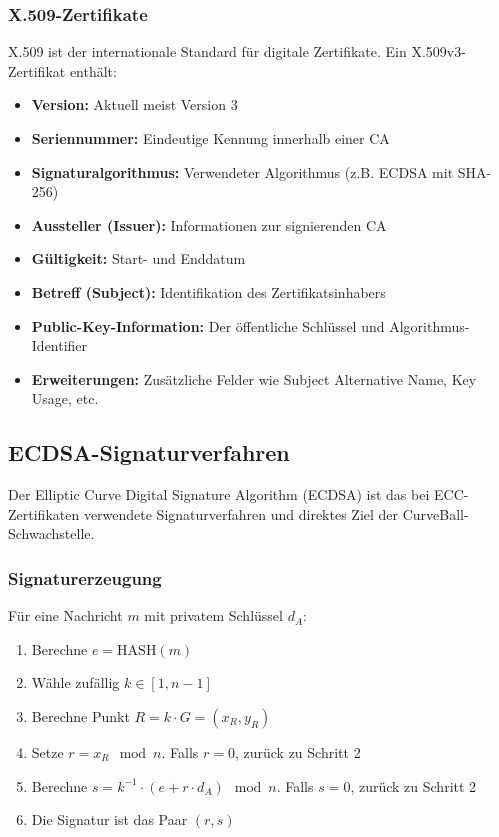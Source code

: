\documentclass{article}
\begin{document}
\subsubsection{X.509-Zertifikate}
X.509 ist der internationale Standard für digitale Zertifikate. Ein X.509v3-Zertifikat enthält:

\begin{itemize}
  \item \textbf{Version:} Aktuell meist Version 3
  \item \textbf{Seriennummer:} Eindeutige Kennung innerhalb einer CA
  \item \textbf{Signaturalgorithmus:} Verwendeter Algorithmus (z.B. ECDSA mit SHA-256)
  \item \textbf{Aussteller (Issuer):} Informationen zur signierenden CA
  \item \textbf{Gültigkeit:} Start- und Enddatum
  \item \textbf{Betreff (Subject):} Identifikation des Zertifikatsinhabers
  \item \textbf{Public-Key-Information:} Der öffentliche Schlüssel und Algorithmus-Identifier
  \item \textbf{Erweiterungen:} Zusätzliche Felder wie Subject Alternative Name, Key Usage, etc.
\end{itemize}

\subsection{ECDSA-Signaturverfahren}

Der Elliptic Curve Digital Signature Algorithm (ECDSA) ist das bei ECC-Zertifikaten verwendete Signaturverfahren und direktes Ziel der CurveBall-Schwachstelle.

\subsubsection{Signaturerzeugung}
Für eine Nachricht \(m\) mit privatem Schlüssel \(d_A\):
\begin{enumerate}
  \item Berechne \(e = \text{HASH}(m)\)
  \item Wähle zufällig \(k \in [1, n-1]\)
  \item Berechne Punkt \(R = k \cdot G = (x_R, y_R)\)
  \item Setze \(r = x_R \mod n\). Falls \(r = 0\), zurück zu Schritt 2
  \item Berechne \(s = k^{-1} \cdot (e + r \cdot d_A) \mod n\). Falls \(s = 0\), zurück zu Schritt 2
  \item Die Signatur ist das Paar \((r, s)\)
\end{enumerate}
\end{document}
